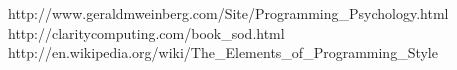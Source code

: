 \begin{center}
                      {http://www.geraldmweinberg.com/Site/Programming_Psychology.html}
                      {http://claritycomputing.com/book_sod.html}
                      {http://en.wikipedia.org/wiki/The_Elements_of_Programming_Style}

\end{center}

